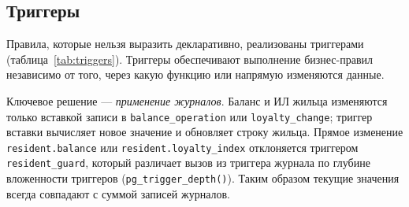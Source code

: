 \documentclass[12pt,a4paper]{article}
\begin{document}
\subsection{Триггеры}
Правила, которые нельзя выразить декларативно, реализованы триггерами (таблица~\ref{tab:triggers}).
Триггеры обеспечивают выполнение бизнес-правил независимо от того, через какую функцию или
напрямую изменяются данные.

Ключевое решение --- \emph{применение журналов}. Баланс и ИЛ жильца изменяются только вставкой
записи в \texttt{balance\_\allowbreak{}operation} или \texttt{loyalty\_\allowbreak{}change}; триггер вставки вычисляет новое
значение и обновляет строку жильца. Прямое изменение \texttt{resident.\allowbreak{}balance} или
\texttt{resident.\allowbreak{}loyalty\_\allowbreak{}index} отклоняется триггером \texttt{resident\_\allowbreak{}guard}, который различает
вызов из триггера журнала по глубине вложенности триггеров (\texttt{pg\_\allowbreak{}trigger\_\allowbreak{}depth()}).
Таким образом текущие значения всегда совпадают с суммой записей журналов.
\end{document}

